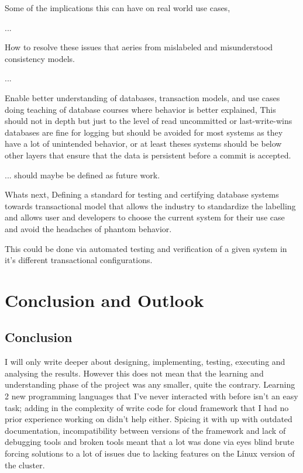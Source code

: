 \documentclass[a4paper,10pt,titlepage]{report}
\begin{document}
Some of the implications this can have on real world use cases,

...

How to resolve these issues that aeries from mislabeled and misunderstood consistency models.

...

Enable better understanding of databases, transaction models, and use cases doing teaching of database courses where behavior is better explained, This should not in depth but just to the level of read uncommitted or last-write-wins databases are fine for logging but should be avoided for most systems as they have a lot of unintended behavior, or at least theses systems should be below other layers that ensure that the data is persistent before a commit is accepted.

... should maybe be defined as future work.

Whats next, Defining a standard for testing and certifying database systems towards transactional model that allows the industry to standardize the labelling and allows user and developers to choose the current system for their use case and avoid the headaches of phantom behavior.

This could be done via automated testing and verification of a given system in it's different transactional configurations.


\chapter{Conclusion and Outlook}
\section*{Conclusion}

 I will only write deeper about designing, implementing, testing, executing and analysing the results. However this does not mean that the learning and understanding phase of the project was any smaller, quite the contrary. Learning 2 new programming languages that I've never interacted with before isn't an easy task; adding in the complexity of write code for cloud framework that I had no prior experience working on didn't help either. Spicing it with up with outdated documentation, incompatibility between versions of the framework and lack of debugging tools and broken tools meant that a lot was done via eyes blind brute forcing solutions to a lot of issues due to lacking features on the Linux version of the cluster.\\
 
\end{document}
